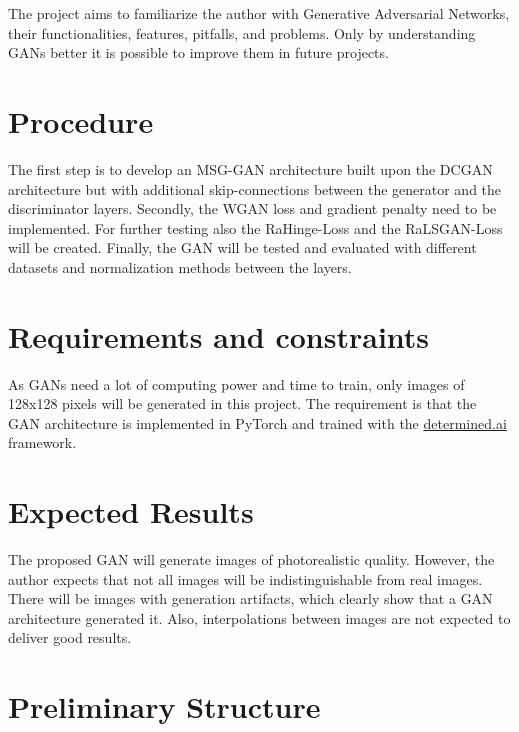 \documentclass[conference,onecolumn,compsoc]{IEEEtran}
\begin{document}
\noindent
The project aims to familiarize the author with Generative Adversarial Networks, their functionalities, features, pitfalls, and problems. Only by understanding GANs better it is possible to improve them in future projects.

\section{Procedure}

\noindent
The first step is to develop an MSG-GAN \cite{karnewar2020msggan} architecture built upon the DCGAN \cite{radford2016unsupervised} architecture but with additional skip-connections between the generator and the discriminator layers. Secondly, the WGAN loss \cite{arjovsky2017wasserstein} and gradient penalty \cite{gulrajani2017improved} need to be implemented. For further testing also the RaHinge-Loss and the RaLSGAN-Loss \cite{jolicoeurmartineau2018relativistic} will be created. Finally, the GAN will be tested and evaluated with different datasets and normalization methods between the layers.

\section{Requirements and constraints}

\noindent
As GANs need a lot of computing power and time to train, only images of 128x128 pixels will be generated in this project. The requirement is that the GAN architecture is implemented in PyTorch \cite{paszke2019pytorch} and trained with the \url{determined.ai} framework.

\section{Expected Results}

\noindent
The proposed GAN will generate images of photorealistic quality. However, the author expects that not all images will be indistinguishable from real images. There will be images with generation artifacts, which clearly show that a GAN architecture generated it. Also, interpolations between images are not expected to deliver good results.

\newpage

\section{Preliminary Structure}
\end{document}
